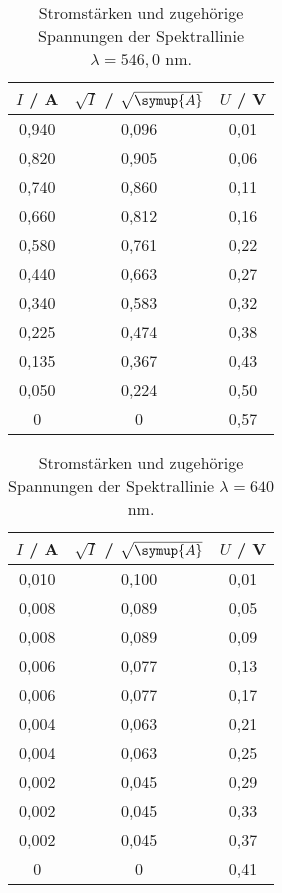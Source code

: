\begin{table}
\centering
\caption{Stromstärken und zugehörige Spannungen der Spektrallinie $\lambda = 546,0$ nm.} 
        \begin{tabular}{c c c}
            \toprule
            { $I$ / A} & {$\sqrt{I}$ / $\sqrt{\symup{A}}$} & {$U$ / V} \\
            \midrule
               0,940 & 0,096 & 0,01 \\
               0,820 & 0,905 & 0,06 \\
               0,740 & 0,860 & 0,11 \\
               0,660 & 0,812 & 0,16 \\
               0,580 & 0,761 & 0,22 \\
               0,440 & 0,663 & 0,27 \\
               0,340 & 0,583 & 0,32 \\
               0,225 & 0,474 & 0,38 \\
               0,135 & 0,367 & 0,43 \\
               0,050 & 0,224 & 0,50 \\
               0     & 0 & 0,57 \\
            \bottomrule
        \end{tabular}
        
        \end{table}
\begin{table}
\centering
\caption{Stromstärken und zugehörige Spannungen der Spektrallinie $\lambda = 640 $ nm.} 
        \begin{tabular}{c c c}
            \toprule
            { $I$ / A} & {$\sqrt{I}$ / $\sqrt{\symup{A}}$} & {$U$ / V} \\
            \midrule
               0,010 & 0,100 & 0,01 \\
               0,008 & 0,089 & 0,05 \\
               0,008 & 0,089 & 0,09 \\
               0,006 & 0,077 & 0,13 \\
               0,006 & 0,077 & 0,17 \\
               0,004 & 0,063 & 0,21 \\
               0,004 & 0,063 & 0,25 \\
               0,002 & 0,045 & 0,29 \\
               0,002 & 0,045 & 0,33 \\
               0,002 & 0,045 & 0,37 \\
               0 & 0& 0,41 \\
         \bottomrule
        \end{tabular}
        
        \end{table}
